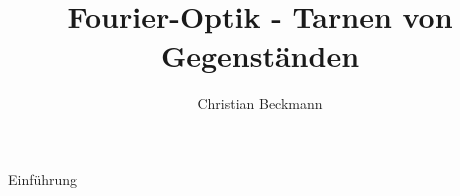 \documentclass[aspectratio=169, 9pt]{beamer}
\title{Fourier-Optik - Tarnen von Gegenständen}
\author[C.~Beckmann]{Christian Beckmann}
\institute[Seminar Moderne Optik]{Seminar Moderne Optik}
\begin{document}
\maketitle

\begin{frame}{Einführung}
  \tableofcontents
\end{frame}
\end{document}
